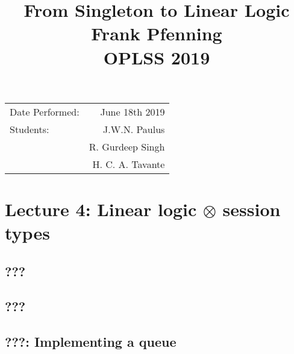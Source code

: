 \documentclass{article}
\title{From Singleton to Linear Logic \\ Frank Pfenning \\ OPLSS 2019} %
\begin{document}
	
	\maketitle %
	
	\begin{center}
		\begin{tabular}{l r}
			Date Performed: & June 18th 2019 \\ %
			Students: & J.W.N. Paulus  \\
			& R. Gurdeep Singh \\ %
			& H. C. A. Tavante
		\end{tabular}
	\end{center}
	
	
	\setcounter{section}{3} %
	\section{Lecture 4: Linear logic \(\otimes\) session types}
	\subsection{???}
	\subsection{???}
	\subsection{???: Implementing a queue}
	
	
	
	
	
	
	
	
	
	
	
\end{document}
